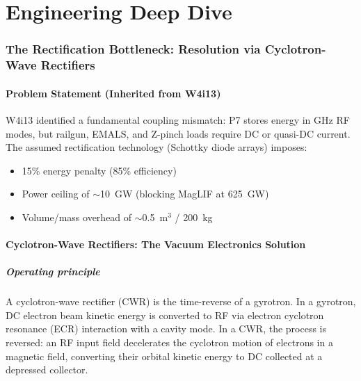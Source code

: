 \documentclass[11pt]{article}
\begin{document}
\part{Engineering Deep Dive}
\label{part:engineering}

\section{The Rectification Bottleneck: Resolution via Cyclotron-Wave Rectifiers}
\label{sec:CWR}

\subsection{Problem Statement (Inherited from W4i13)}

W4i13 identified a fundamental coupling mismatch: P7 stores energy in
GHz RF modes, but railgun, EMALS, and Z-pinch loads require DC or
quasi-DC current. The assumed rectification technology (Schottky diode
arrays) imposes:
\begin{itemize}[nosep]
  \item 15\% energy penalty (85\% efficiency)
  \item Power ceiling of $\sim$10~GW (blocking MagLIF at 625~GW)
  \item Volume/mass overhead of $\sim$0.5~m$^3$ / 200~kg
\end{itemize}

\subsection{Cyclotron-Wave Rectifiers: The Vacuum Electronics Solution}

\subsubsection{Operating principle}

A cyclotron-wave rectifier (CWR) is the time-reverse of a gyrotron.
In a gyrotron, DC electron beam kinetic energy is converted to RF via
electron cyclotron resonance (ECR) interaction with a cavity mode. In
a CWR, the process is reversed: an RF input field decelerates the
cyclotron motion of electrons in a magnetic field, converting their
orbital kinetic energy to DC collected at a depressed collector.
\end{document}
